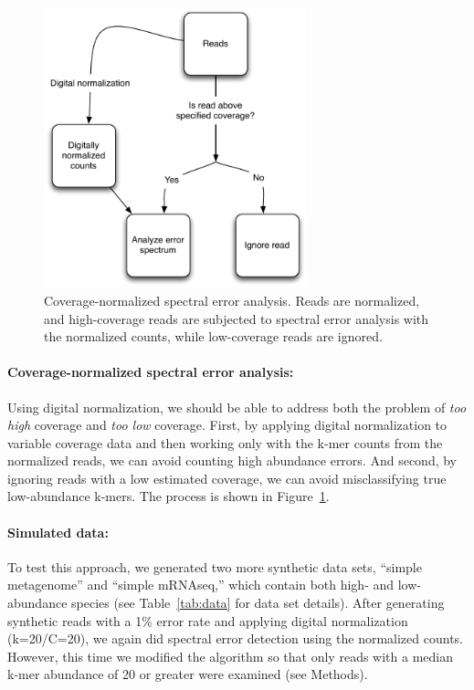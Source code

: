 \documentclass{article}
\begin{document}
\begin{figure}[!ht]
 \centerline{\includegraphics[width=3in]{./figures/coverage-aware-spectrum}}
\caption{Coverage-normalized spectral error analysis.  Reads are normalized,
and high-coverage reads are subjected to spectral error analysis with the
normalized counts, while low-coverage reads are ignored.}
\label{fig:covaware}
\end{figure}

\paragraph{Coverage-normalized spectral error analysis:}

Using digital normalization, we should be able to address both the
problem of {\em too high} coverage and {\em too low} coverage.
First, by applying digital normalization to variable
coverage data and then working only with the k-mer counts from the
normalized reads, we can avoid counting high abundance errors.
And second, by ignoring reads with a low estimated coverage, we can
avoid misclassifying true low-abundance k-mers.  The process
is shown in  Figure~\ref{fig:covaware}.


\paragraph{Simulated data:}
To test this approach, we generated two more synthetic data sets,
``simple metagenome'' and ``simple mRNAseq,'' which contain both high-
and low-abundance species (see Table~\ref{tab:data} for data set
details).  After generating synthetic reads with a 1\% error rate and
applying digital normalization (k=20/C=20), we again did spectral
error detection using the normalized counts.  However, this time we
modified the algorithm so that only reads with a median k-mer
abundance of 20 or greater were examined (see Methods).
\end{document}
